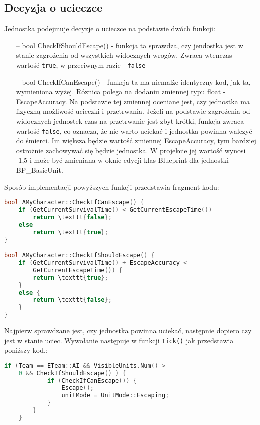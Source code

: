 \documentclass[12pt]{report}
\begin{document}
\subsection{Decyzja o ucieczce}

Jednostka podejmuje decyzje o ucieczce na podstawie dwóch funkcji: 
\begin{itemize}
\item[--] bool CheckIfShouldEscape() - funkcja ta sprawdza, czy jendostka jest w stanie zagrożenia od wszystkich widocznych wrogów. Zwraca wtenczas wartość \texttt{true}, w przeciwnym razie - \texttt{false}
\item[--] bool CheckIfCanEscape() - funkcja ta ma niemalże identyczny kod, jak ta, wymieniona wyżej. Róznica polega na dodaniu zmiennej typu float - EscapeAccuracy. Na podstawie tej zmiennej oceniane jest, czy jednostka ma fizyczną możliwość ucieczki i przetrwania. Jeżeli na podstawie zagrożenia od widocznych jednostek czas na przetrwanie jest zbyt krótki, funkcja zwraca wartość \texttt{false}, co oznacza, że nie warto uciekać i jednostka powinna walczyć do śmierci. Im większa będzie wartość zmiennej EscapeAccuracy, tym bardziej ostrożnie zachowywać się będzie jednostka. W projekcie jej wartość wynosi -1,5 i może być zmieniana w oknie edycji klas Blueprint dla jednostki BP\_BasicUnit.
\end{itemize}

Sposób implementacji powyższych funkcji przedstawia fragment kodu:

\begin{lstlisting}[language=C++, backgroundcolor=\color{black!5}, basicstyle=\footnotesize, caption=Funkcje CheckIfShouldEscape i CheckIfCanEscape w klasie \texttt{AMyCharacter.cpp}.]
bool AMyCharacter::CheckIfCanEscape() {
	if (GetCurrentSurvivalTime() < GetCurrentEscapeTime())
		return \texttt{false};
	else
		return \texttt{true};
}

bool AMyCharacter::CheckIfShouldEscape() {
	if (GetCurrentSurvivalTime() + EscapeAccuracy < 
	    GetCurrentEscapeTime()) {
		return \texttt{true};
	}
	else {
		return \texttt{false};
	}
}
\end{lstlisting}

Najpierw sprawdzane jest, czy jednostka powinna uciekać, następnie dopiero czy jest w stanie uciec. Wywołanie następuje w funkcji \texttt{\texttt{Tick}()} jak przedstawia poniższy kod.:

\begin{lstlisting}[language=C++, backgroundcolor=\color{black!5}, basicstyle=\footnotesize, caption=Wywołanie funkcji CheckIfShouldEscape i CheckIfCanEscape w funkcji \texttt{\texttt{Tick}()} klasy AMyCharacter.]
if (Team == ETeam::AI && VisibleUnits.Num() > 
    0 && CheckIfShouldEscape() ) {
			if (CheckIfCanEscape()) {
				Escape();
				unitMode = UnitMode::Escaping;
			}
		}
	}
\end{lstlisting}
\end{document}
